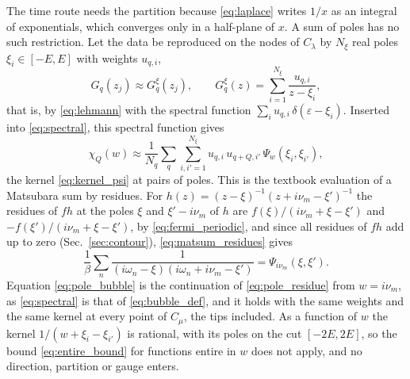 \documentclass[aps,prb,reprint,a4paper]{revtex4-2}
\begin{document}
The time route needs the partition because \eqref{eq:laplace} writes $1/x$ as an integral of exponentials, which converges only in a half-plane of $x$. A sum of poles has no such restriction. Let the data be reproduced on the nodes of $C_\lambda$ by $N_\xi$ real poles $\xi_i\in[-E,E]$ with weights $u_{q,i}$,
\begin{equation}
  G_q(z_j)\approx G^\xi_q(z_j),\qquad G^\xi_q(z)=\sum_{i=1}^{N_\xi}\frac{u_{q,i}}{z-\xi_i},
  \label{eq:poles}
\end{equation}
that is, by \eqref{eq:lehmann} with the spectral function $\sum_iu_{q,i}\,\delta(\varepsilon-\xi_i)$. Inserted into \eqref{eq:spectral}, this spectral function gives
\begin{equation}
  \chi_Q(w)\approx\frac1{N_q}\sum_q\sum_{i,i'=1}^{N_\xi}u_{q,i}\,u_{q+Q,i'}\,\Psi_w(\xi_i,\xi_{i'}),
  \label{eq:pole_bubble}
\end{equation}
the kernel \eqref{eq:kernel_psi} at pairs of poles. This is the textbook evaluation of a Matsubara sum by residues. For $h(z)=(z-\xi)^{-1}(z+i\nu_m-\xi')^{-1}$ the residues of $fh$ at the poles $\xi$ and $\xi'-i\nu_m$ of $h$ are $f(\xi)/(i\nu_m+\xi-\xi')$ and $-f(\xi')/(i\nu_m+\xi-\xi')$, by \eqref{eq:fermi_periodic}, and since all residues of $fh$ add up to zero (Sec.~\ref{sec:contour}), \eqref{eq:matsum_residues} gives
\begin{equation}
  \frac1\beta\sum_n\frac1{(i\omega_n-\xi)(i\omega_n+i\nu_m-\xi')}=\Psi_{i\nu_m}(\xi,\xi').
  \label{eq:pole_residue}
\end{equation}
Equation \eqref{eq:pole_bubble} is the continuation of \eqref{eq:pole_residue} from $w=i\nu_m$, as \eqref{eq:spectral} is that of \eqref{eq:bubble_def}, and it holds with the same weights and the same kernel at every point of $C_\mu$, the tips included. As a function of $w$ the kernel $1/(w+\xi_i-\xi_{i'})$ is rational, with its poles on the cut $[-2E,2E]$, so the bound \eqref{eq:entire_bound} for functions entire in $w$ does not apply, and no direction, partition or gauge enters.
\end{document}
